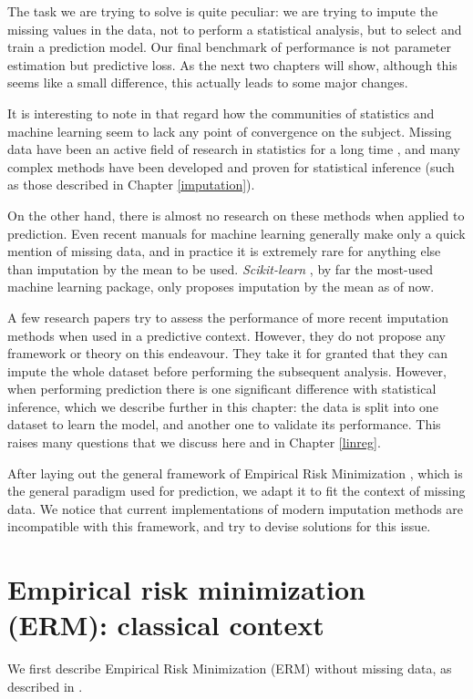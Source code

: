 The task we are trying to solve is quite peculiar: we are trying to impute the missing values in the data, not to perform a statistical analysis, but to select and train a prediction model. Our final benchmark of performance is not parameter estimation but predictive loss. As the next two chapters will show, although this seems like a small difference, this actually leads to some major changes.

It is interesting to note in that regard how the communities of statistics and machine learning seem to lack any point of convergence on the subject. Missing data have been an active field of research in statistics for a long time \cite{rubin1976inference}, and many complex methods have been developed and proven for statistical inference \cite{Rubin_missdata} (such as those described in Chapter \ref{imputation}).

On the other hand, there is almost no research on these methods when applied to prediction. Even recent manuals for machine learning \cite{ML_missdata} generally make only a quick mention of missing data, and in practice it is extremely rare for anything else than imputation by the mean to be used. \emph{Scikit-learn} \cite{scikit-learn}, by far the most-used machine learning package, only proposes imputation by the mean as of now. 

A few research papers \cite{prediction_imputation1} \cite{prediction_imputation2} try to assess the performance of more recent imputation methods when used in a predictive context. However, they do not propose any framework or theory on this endeavour. They take it for granted that they can impute the whole dataset before performing the subsequent analysis. However, when performing prediction there is one significant difference with statistical inference, which we describe further in this chapter: the data is split into one dataset to learn the model, and another one to validate its performance. This raises many questions that we discuss here and in Chapter \ref{linreg}. 

After laying out the general framework of Empirical Risk Minimization \cite{ERM}, which is the general paradigm used for prediction, we adapt it to fit the context of missing data. We notice that current implementations of modern imputation methods are incompatible with this framework, and try to devise solutions for this issue.
	\section{Empirical risk minimization (ERM): classical context}
We first describe Empirical Risk Minimization (ERM) without missing data, as described in \cite{ERM}.
